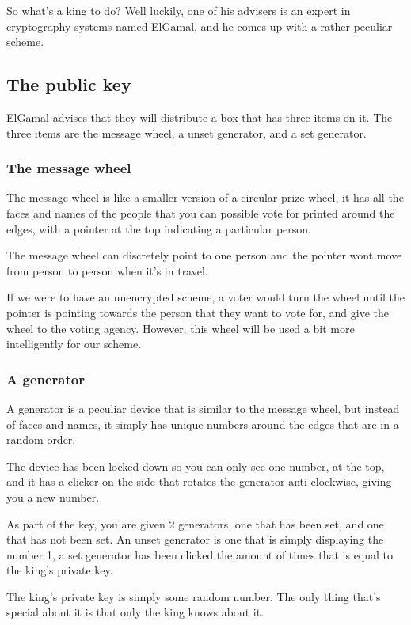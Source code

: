 \documentclass{article}
\begin{document}
  So what's a king to do? Well luckily, one of his advisers is an expert in 
  cryptography systems named ElGamal, and he comes up with a rather peculiar scheme.

  \subsection*{The public key}
  ElGamal advises that they will distribute a box that has three items on it.
  The three items are the message wheel, a unset generator, and a set generator.

  \subsubsection*{The message wheel}
  The message wheel is like a smaller version of a circular prize wheel, it has all the
  faces and names of the people that you can possible vote for printed around
  the edges, with a pointer at the top indicating a particular person.

  The message wheel can discretely point to one person and the pointer wont
  move from person to person when it's in travel.

  If we were to have an unencrypted scheme, a voter would turn the wheel until
  the pointer is pointing towards the person that they want to vote for, and 
  give the wheel to the voting agency. However, this wheel will be used a bit more
  intelligently for our scheme.

  \subsubsection*{A generator}
  A generator is a peculiar device that is similar to the message wheel, but
  instead of faces and names, it simply has unique numbers around the edges
  that are in a random order. 
  
  The device has been locked down so you can only see one number, at the top,
  and it has a clicker on the side that rotates the generator anti-clockwise,
  giving you a new number.

  As part of the key, you are given 2 generators, one that has been set, and
  one that has not been set. An unset generator is one that is simply displaying
  the number 1, a set generator has been clicked the amount of times that is
  equal to the king's private key.

  The king's private key is simply some random number. The only thing that's 
  special about it is that only the king knows about it.
\end{document}
